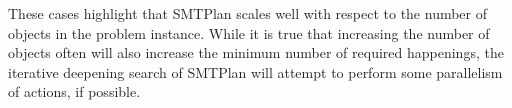 These cases highlight that SMTPlan scales well with respect to the number of objects in the problem instance. While it is true that increasing the number of objects often will also increase the minimum number of required happenings, the iterative deepening search of SMTPlan will attempt to perform some parallelism of actions, if possible.

